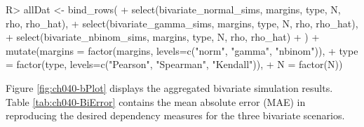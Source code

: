 \documentclass[
]{jss}
\begin{document}
\begin{CodeChunk}
\begin{CodeInput}
R> allDat <- bind_rows(
+     select(bivariate_normal_sims, margins, type, N, rho, rho_hat),
+     select(bivariate_gamma_sims, margins, type, N, rho, rho_hat),
+     select(bivariate_nbinom_sims, margins, type, N, rho, rho_hat)
+ ) %
+     mutate(margins = factor(margins, levels=c("norm", "gamma", "nbinom")),
+            type = factor(type, levels=c("Pearson", "Spearman", "Kendall")),
+            N = factor(N))
\end{CodeInput}
\end{CodeChunk}

Figure \ref{fig:ch040-bPlot} displays the aggregated bivariate simulation results. Table \ref{tab:ch040-BiError} contains the mean absolute error (MAE) in reproducing the desired dependency measures for the three bivariate scenarios.
\end{document}
